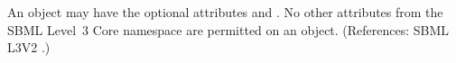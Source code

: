 An \AlgebraicRule object may have the optional attributes  
and .  No other attributes from the SBML Level~3 Core
namespace are permitted on an \AlgebraicRule object.  (References: SBML
L3V2 .)
